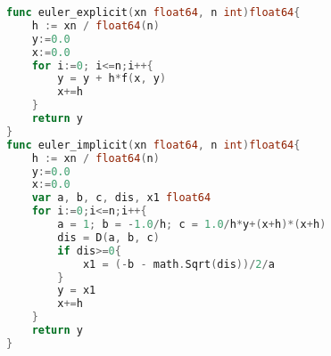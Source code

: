 \documentclass[12pt]{report}
\begin{document}
\begin{lstlisting}[label=euler,caption = Явный и неявный методы Эйлера, language = go]
func euler_explicit(xn float64, n int)float64{
	h := xn / float64(n)
	y:=0.0 
	x:=0.0
	for i:=0; i<=n;i++{
		y = y + h*f(x, y)
		x+=h
	}
	return y
}
func euler_implicit(xn float64, n int)float64{
	h := xn / float64(n)
	y:=0.0 
	x:=0.0
	var a, b, c, dis, x1 float64
	for i:=0;i<=n;i++{
		a = 1; b = -1.0/h; c = 1.0/h*y+(x+h)*(x+h)
		dis = D(a, b, c)
		if dis>=0{
			x1 = (-b - math.Sqrt(dis))/2/a
		}
		y = x1
		x+=h
	}
	return y
}
\end{lstlisting}
\end{document}
